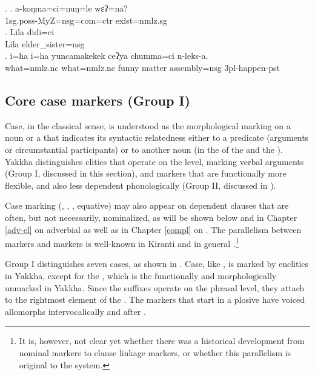 \ex. \ag. a-koŋma=ci=nuŋ=le wɛʔ=na?\\
		{\sc 1sg.poss-}MyZ{\sc =nsg=com=ctr} exist{\sc [3sg]=nmlz.sg}\\
		  
	\bg. Lila didi=ci\\
		Lila elder\_sister{\sc =nsg}\\
		  
		\bg.  i=ha i=ha    yuncamakekek ceʔya chumma=ci     n-leks-a.\\
		what{\sc =nmlz.nc} what{\sc =nmlz.nc} funny        matter assembly{\sc =nsg} {\sc 3pl-}happen{\sc -pst}\\
		 
	
\subsection{Core case markers (Group I)}\label{case}

Case, in the classical sense, is understood as the morphological marking on a noun or a  that indicates its syntactic relatedness either to a predicate (arguments or circumstantial participants)  or to  another noun (in the  of the  and the ). Yakkha distinguishes   clitics  that operate on the  level, marking verbal arguments  (Group I, discussed in this section), and markers that are functionally more flexible, and also less dependent phonologically (Group II, discussed in ).


Case marking (, , , equative) may also appear on dependent clauses that are often, but not necessarily, nominalized, as will be shown below and in Chapter \ref{adv-cl} on adverbial  as well as in Chapter \ref{compl} on . The parallelism between  markers and  markers is well-known in Kiranti and  in general \citep{Genetti1986The-development, DeLancey1985_Etymological, Ebert1993Kiranti}.\footnote{It is, however, not clear yet whether there  was a historical development from nominal  markers to  clause linkage markers, or whether this parallelism is original to the system.} 

Group I distinguishes seven cases, as shown in . Case, like , is marked by enclitics in Yakkha, except for the , which is the functionally and morphologically unmarked  in Yakkha. Since the  suffixes operate on the phrasal level, they attach to the rightmost element of the . The  markers that start in a plosive have voiced allomorphs intervocalically and after .



